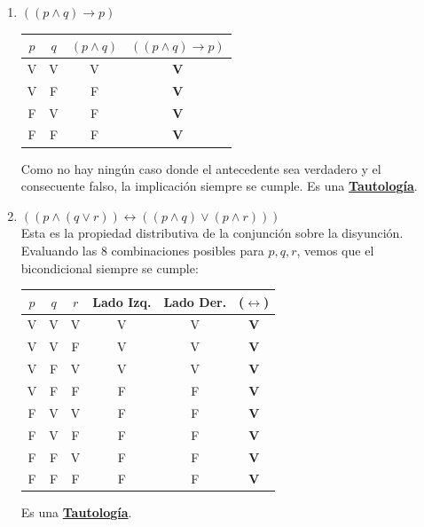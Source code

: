 \begin{enumerate}[label=\textbf{\alph*)}]
    \vspace{0.4cm}
    \item \textbf{$((p \wedge q) \rightarrow p)$}
    \begin{center}
    \begin{tabular}{|c|c|c|c|}
    \hline
    $p$ & $q$ & $(p \wedge q)$ & $((p \wedge q) \rightarrow p)$ \\
    \hline
    V & V & V & \textbf{V} \\
    V & F & F & \textbf{V} \\
    F & V & F & \textbf{V} \\
    F & F & F & \textbf{V} \\
    \hline
    \end{tabular}
    \end{center}
    Como no hay ningún caso donde el antecedente sea verdadero y el consecuente falso, la implicación siempre se cumple. Es una \underline{\textbf{Tautología}}.

    \vspace{0.4cm}
    \item \textbf{$((p \wedge (q \vee r)) \leftrightarrow ((p \wedge q) \vee (p \wedge r)))$} \\
    Esta es la propiedad distributiva de la conjunción sobre la disyunción. Evaluando las 8 combinaciones posibles para $p, q, r$, vemos que el bicondicional siempre se cumple:
    \begin{center}
    \begin{tabular}{|c|c|c|c|c|c|}
    \hline
    $p$ & $q$ & $r$ & Lado Izq. & Lado Der. & ($\leftrightarrow$) \\
    \hline
    V & V & V & V & V & \textbf{V} \\
    V & V & F & V & V & \textbf{V} \\
    V & F & V & V & V & \textbf{V} \\
    V & F & F & F & F & \textbf{V} \\
    F & V & V & F & F & \textbf{V} \\
    F & V & F & F & F & \textbf{V} \\
    F & F & V & F & F & \textbf{V} \\
    F & F & F & F & F & \textbf{V} \\
    \hline
    \end{tabular}
    \end{center}
    Es una \underline{\textbf{Tautología}}.


\end{enumerate}
